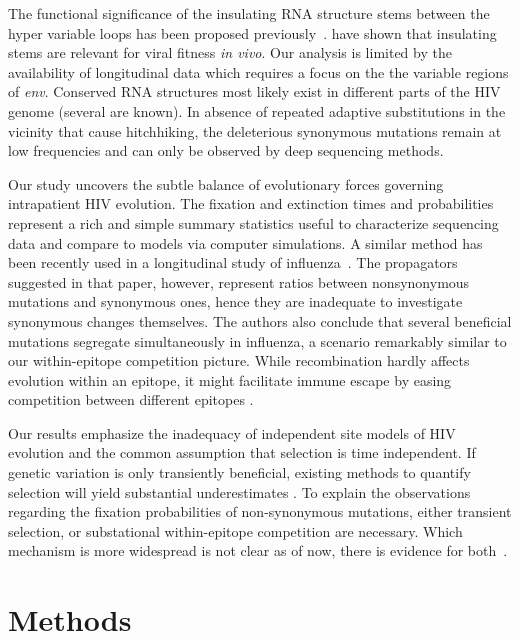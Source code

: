 \documentclass[rmp, twocolumn]{revtex4}
\newcommand{\env}{\textit{env}}
\begin{document}
The functional significance of the insulating RNA structure stems between the
hyper variable loops has been proposed
previously~\citep{watts_architecture_2009, sanjuan_interplay_2011}.
\citet{sanjuan_interplay_2011} have shown that insulating stems are relevant for
viral fitness {\it in vivo}. Our analysis is limited by the availability of
longitudinal data which requires a focus on the the variable regions of \env.
Conserved RNA structures most likely exist in different parts
of the HIV genome (several are known). In absence of repeated adaptive substitutions in the vicinity
that cause hitchhiking, the deleterious synonymous mutations remain at low
frequencies and can only be observed by deep sequencing methods. 

Our study uncovers the
subtle balance of evolutionary forces governing intrapatient HIV evolution. The
fixation and extinction times and probabilities represent a rich and simple
summary statistics useful to characterize sequencing data and compare to
models via computer simulations.
A similar method has been recently used in a longitudinal study of
influenza~\citep{strelkowa_clonal_2012}. The propagators suggested in that
paper, however, represent ratios between nonsynonymous
mutations and synonymous ones, hence they are inadequate to investigate
synonymous changes themselves. The authors also conclude that several
beneficial mutations segregate simultaneously in influenza, a scenario
remarkably similar to our within-epitope competition picture. While
recombination hardly affects evolution within an epitope, it might facilitate
immune escape by easing competition between different epitopes
\citep{neher_rate_2010,Rouzine:2005p17398}.

Our results emphasize the inadequacy of independent site
models of HIV evolution and the common assumption that selection is time
independent. If genetic variation is only transiently beneficial, existing
methods to quantify selection will yield substantial underestimates
\citep{williamson_adaptation_2003,neher_rate_2010,OTHER}. To explain the
observations regarding the fixation probabilities of non-synonymous mutations,
either transient selection, or substational within-epitope competition are
necessary. Which mechanism is more widespread is not clear as of now,
there is evidence for both~\citep{richman_rapid_2003, moore_limited_2009,
bar_early_2012}.

\section{Methods}
\end{document}

